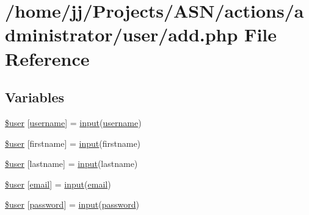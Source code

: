 \hypertarget{actions_2administrator_2user_2add_8php}{}\section{/home/jj/\+Projects/\+A\+S\+N/actions/administrator/user/add.php File Reference}
\label{actions_2administrator_2user_2add_8php}
\subsection*{Variables}
\begin{DoxyCompactItemize}
\item 
\hyperlink{actions_2administrator_2user_2add_8php_a48c184d1487bdbc0b0d2fe6e1521dd7d}{\$user} \mbox{[}\textquotesingle{}\hyperlink{actions_2account_8php_ac9b3768ccc688c2ff0811c50c107a02e}{username}\textquotesingle{}\mbox{]} = \hyperlink{ossn_8lib_8input_8php_a64ebee98b041c4f75f71ed3cd73cc8ed}{input}(\textquotesingle{}\hyperlink{actions_2account_8php_ac9b3768ccc688c2ff0811c50c107a02e}{username}\textquotesingle{})
\item 
\hyperlink{actions_2administrator_2user_2add_8php_a3c8ba9ea696968574370c51a90ff638c}{\$user} \mbox{[}\textquotesingle{}firstname\textquotesingle{}\mbox{]} = \hyperlink{ossn_8lib_8input_8php_a64ebee98b041c4f75f71ed3cd73cc8ed}{input}(\textquotesingle{}firstname\textquotesingle{})
\item 
\hyperlink{actions_2administrator_2user_2add_8php_a1187774c6d9942181216e0839e5e73bc}{\$user} \mbox{[}\textquotesingle{}lastname\textquotesingle{}\mbox{]} = \hyperlink{ossn_8lib_8input_8php_a64ebee98b041c4f75f71ed3cd73cc8ed}{input}(\textquotesingle{}lastname\textquotesingle{})
\item 
\hyperlink{actions_2administrator_2user_2add_8php_ae9de5cc5ae3fec81bb110d3a77ad7eec}{\$user} \mbox{[}\textquotesingle{}\hyperlink{actions_2account_8php_a011c66ae212438e0d7de7c0e40451bb3}{email}\textquotesingle{}\mbox{]} = \hyperlink{ossn_8lib_8input_8php_a64ebee98b041c4f75f71ed3cd73cc8ed}{input}(\textquotesingle{}\hyperlink{actions_2account_8php_a011c66ae212438e0d7de7c0e40451bb3}{email}\textquotesingle{})
\item 
\hyperlink{actions_2administrator_2user_2add_8php_a5afbe215d7a53599cd9f661abf8196e2}{\$user} \mbox{[}\textquotesingle{}\hyperlink{actions_2account_8php_a3ef39d3ee8b2bcca6a288308549ccb44}{password}\textquotesingle{}\mbox{]} = \hyperlink{ossn_8lib_8input_8php_a64ebee98b041c4f75f71ed3cd73cc8ed}{input}(\textquotesingle{}\hyperlink{actions_2account_8php_a3ef39d3ee8b2bcca6a288308549ccb44}{password}\textquotesingle{})

\end{DoxyCompactItemize}
